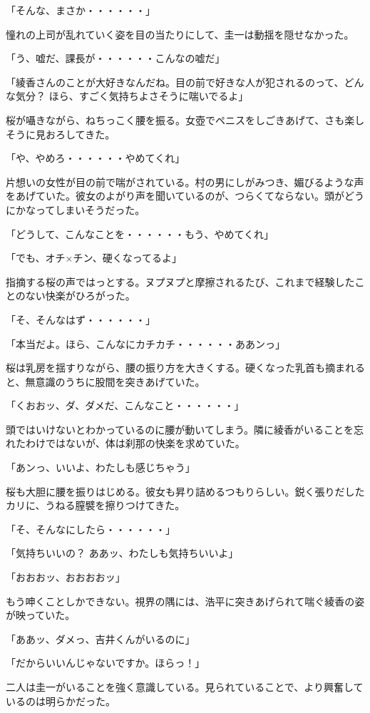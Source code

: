 ﻿\documentclass[book,tate]{jlreq}
\begin{document}
「そんな、まさか・・・・・・」

憧れの上司が乱れていく姿を目の当たりにして、圭一は動揺を隠せなかった。

「う、嘘だ、課長が・・・・・・こんなの嘘だ」

「綾香さんのことが大好きなんだね。目の前で好きな人が犯されるのって、どんな気分？ ほら、すごく気持ちよさそうに喘いでるよ」

桜が囁きながら、ねちっこく腰を振る。女壺でペニスをしごきあげて、さも楽しそうに見おろしてきた。

「や、やめろ・・・・・・やめてくれ」

片想いの女性が目の前で喘がされている。村の男にしがみつき、媚びるような声をあげていた。彼女のよがり声を聞いているのが、つらくてならない。頭がどうにかなってしまいそうだった。

「どうして、こんなことを・・・・・・もう、やめてくれ」

「でも、オチ×チン、硬くなってるよ」

指摘する桜の声ではっとする。ヌプヌプと摩擦されるたび、これまで経験したことのない快楽がひろがった。

「そ、そんなはず・・・・・・」

「本当だよ。ほら、こんなにカチカチ・・・・・・ああンっ」

桜は乳房を揺すりながら、腰の振り方を大きくする。硬くなった乳首も摘まれると、無意識のうちに股間を突きあげていた。

「くおおッ、ダ、ダメだ、こんなこと・・・・・・」

頭ではいけないとわかっているのに腰が動いてしまう。隣に綾香がいることを忘れたわけではないが、体は刹那の快楽を求めていた。

「あンっ、いいよ、わたしも感じちゃう」

桜も大胆に腰を振りはじめる。彼女も昇り詰めるつもりらしい。鋭く張りだしたカリに、うねる膣襞を擦りつけてきた。

「そ、そんなにしたら・・・・・・」

「気持ちいいの？ ああッ、わたしも気持ちいいよ」

「おおおッ、おおおおッ」

もう呻くことしかできない。視界の隅には、浩平に突きあげられて喘ぐ綾香の姿が映っていた。

「ああッ、ダメっ、吉井くんがいるのに」

「だからいいんじゃないですか。ほらっ！」

二人は圭一がいることを強く意識している。見られていることで、より興奮しているのは明らかだった。
\end{document}
